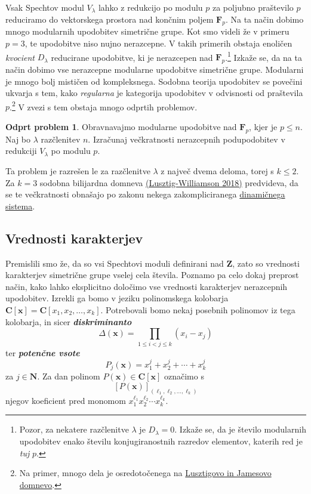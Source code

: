\documentclass[11pt]{book}
\def\NN{\mathbf{N}}
\def\ZZ{\mathbf{Z}}
\def\CC{\mathbf{C}}
\def\FF{\mathbf{F}}
\def\definicija{\color{rdeca}\bf\em}
\def\literatura{\color{modra}}
\theoremstyle{definition}
\theoremstyle{zgled}
\theoremstyle{odprtproblem}
\newtheorem*{odprtproblem}{Odprt problem}
\theoremstyle{domacanaloga}
\theoremstyle{izrek}
\begin{document}
Vsak Spechtov modul $V_{\lambda}$ lahko z redukcijo po modulu $p$ za poljubno praštevilo $p$ reduciramo do vektorskega prostora nad končnim poljem $\FF_p$. Na ta način dobimo mnogo modularnih upodobitev simetrične grupe. Kot smo videli že v primeru $p = 3$, te upodobitve niso nujno nerazcepne. V takih primerih obstaja enoličen \emph{kvocient} $D_{\lambda}$ reducirane upodobitve, ki je nerazcepen nad $\FF_p$.\footnote{Pozor, za nekatere razčlenitve $\lambda$ je $D_{\lambda} = 0$. Izkaže se, da je število modularnih upodobitev enako številu konjugiranostnih razredov elementov, katerih red je \emph{tuj} $p$.} Izkaže se, da na ta način dobimo vse nerazcepne modularne upodobitve simetrične grupe. Modularni je mnogo bolj mističen od kompleksnega. Sodobna teorija upodobitev se povečini ukvarja s tem, kako \emph{regularna} je kategorija upodobitev v odvisnosti od praštevila $p$.\footnote{Na primer, mnogo dela je osredotočenega na \href{https://mathoverflow.net/questions/138310/what-to-do-now-that-lusztigs-and-james-conjectures-have-been-shown-to-be-false}{Lusztigovo in Jamesovo domnevo}.} V zvezi s tem obstaja mnogo odprtih problemov.

\begin{odprtproblem}
Obravnavajmo modularne upodobitve nad $\FF_p$, kjer je $p \leq n$. Naj bo $\lambda$ razčlenitev $n$. Izračunaj večkratnosti nerazcepnih podupodobitev v redukciji $V_{\lambda}$ po modulu $p$.
\end{odprtproblem}

Ta problem je razrešen le za razčlenitve $\lambda$ z največ dvema deloma, torej s $k \leq 2$. Za $k = 3$ sodobna bilijardna domneva {\literatura \href{https://arxiv.org/pdf/1703.05898.pdf}{(Lusztig-Williamson 2018)}} predvideva, da se te večkratnosti obnašajo po zakonu nekega zakompliciranega \href{https://www.youtube.com/watch?v=Ru0Zys1Vvq4}{dinamičnega sistema}.



\subsection{Vrednosti karakterjev}

Premislili smo že, da so vsi Spechtovi moduli definirani nad $\ZZ$, zato so vrednosti karakterjev simetrične grupe vselej cela števila. Poznamo pa celo dokaj preprost način, kako lahko eksplicitno določimo vse vrednosti karakterjev nerazcepnih upodobitev. Izrekli ga bomo v jeziku polinomskega kolobarja $\CC[\mathbf{x}] = \CC[x_1, x_2, \dots, x_k]$. Potrebovali bomo nekaj posebnih polinomov iz tega kolobarja, in sicer {\definicija diskriminanto}
\[
    \Delta(\mathbf{x}) = \prod_{1 \leq i < j \leq k} (x_i - x_j)
\]
ter {\definicija potenčne vsote}
\[
    P_j(\mathbf{x}) = x_1^j + x_2^j + \cdots + x_k^j
\]
za $j \in \NN$. Za dan polinom $P(\mathbf{x}) \in \CC[\mathbf{x}]$ označimo s
\[
    [P(\mathbf{x})]_{(\ell_1, \ell_2, \dots, \ell_k)}
\]
njegov koeficient pred monomom $x_1^{\ell_1} x_2^{\ell_2} \cdots x_k^{\ell_k}$.
\end{document}

